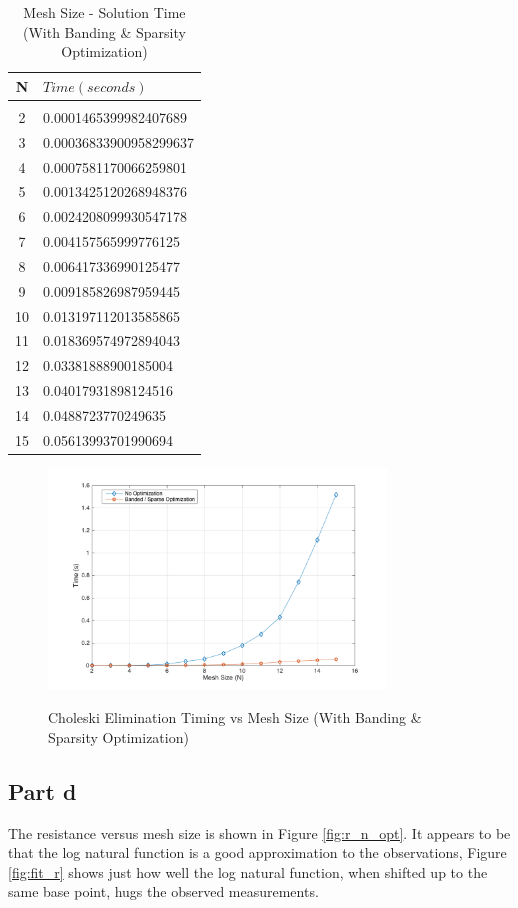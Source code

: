 \documentclass[11pt]{amsart}
\begin{document}
\begin{table}[h!]
    \caption{Mesh Size - Solution Time (With Banding \& Sparsity Optimization)}
    \label{tbl:time_v_mesh_opt}
    \begin{tabular}{ c| l}
    	\textbf{N} & \textbf{$Time (seconds)$}\\ \hline \\
	2 & 0.0001465399982407689\\
	3 & 0.00036833900958299637\\
	4 & 0.0007581170066259801\\
	5 & 0.0013425120268948376\\
	6 & 0.0024208099930547178\\
	7 & 0.004157565999776125\\
	8 & 0.006417336990125477\\
	9 & 0.009185826987959445\\
	10 & 0.013197112013585865\\
	11 & 0.018369574972894043\\
	12 & 0.03381888900185004\\
	13 & 0.04017931898124516\\
	14 & 0.0488723770249635\\
	15 & 0.05613993701990694
    \end{tabular}
\end{table}
\vspace{3em}
\begin{center}
	\begin{figure}[h]
		\caption{Choleski Elimination Timing vs Mesh Size (With Banding \& Sparsity Optimization)}
		\includegraphics[width=0.8\textwidth]{assets/t_vs_n_opt.png}\label{fig:t_n_opt}
	\end{figure}
\end{center}

\subsection*{Part d} The resistance versus mesh size is shown in Figure \ref{fig:r_n_opt}. It appears to be that the log natural function is a good approximation to the observations, Figure \ref{fig:fit_r} shows just how well the log natural function, when shifted up to the same base point, hugs the observed measurements. 
\end{document}
